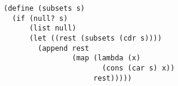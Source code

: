 \documentclass[a4paper,12pt]{article}
\begin{document}
\begin{lstlisting}
(define (subsets s)
  (if (null? s)
      (list null)
      (let ((rest (subsets (cdr s))))
        (append rest
                (map (lambda (x)
                       (cons (car s) x))
                     rest)))))
\end{lstlisting}
\end{document}
